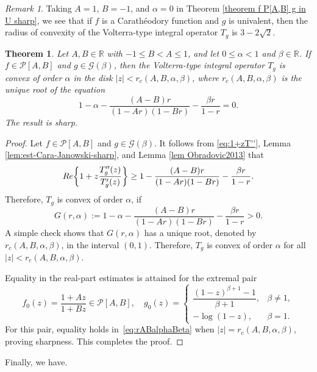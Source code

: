 \documentclass[12pt,a4paper]{amsart}
\numberwithin{equation}{section}
\newtheorem{theorem}{Theorem}[section]
\theoremstyle{remark}
\newtheorem{remark}{Remark}[section]
\begin{document}
\begin{remark}
  Taking $A=1$, $B=-1$, and $\alpha=0$ in Theorem \ref{theorem f P[A,B] g in U sharp}, we see that if $f$ is a Carath\'eodory function and $g$ is univalent, then the radius of convexity of the Volterra-type integral operator $T_g$ is $3-2\sqrt{2}$. 
\end{remark}

\begin{theorem}\label{theorem f starlike g in G beta sharp improved}
Let $A,B\in\mathbb{R}$ with $-1\le B<A\le 1$, and let $0\le \alpha<1$ and $\beta\in \mathbb R$.  
If $f\in\mathcal{P}[A,B]$ and $g\in\mathcal{G}(\beta)$, then the Volterra-type integral operator $T_g$ is convex of order $\alpha$ in the disk $|z|<r_c(A,B,\alpha,\beta)$,  
where \(r_c(A,B,\alpha,\beta)\) is the unique root of the equation
\begin{equation}\label{eq:rABalphaBeta}
1-\alpha-\frac{(A-B)r}{(1-A r)(1-B r)}-\frac{\beta r}{1-r}=0.
\end{equation}
The result is sharp.
\end{theorem}

\begin{proof}
  Let $f\in\mathcal{P}[A,B]$ and $g \in \mathcal{G}(\beta)$. It follows from \eqref{eq:1+zT''}, Lemma \ref{lem:est-Cara-Janowski-sharp}, and Lemma \ref{lem Obradovic2013} that
\[
{\rm Re}\!\left\{1+z\frac{T_g''(z)}{T_g'(z)}\right\}
\ge 1-\frac{(A-B)r}{(1-A r)(1-B r)}-\frac{\beta r}{1-r}.
\]
Therefore, \(T_g\) is convex of order \(\alpha\), if
\[
G(r,\alpha):=1-\alpha-\frac{(A-B)r}{(1-A r)(1-B r)}-\frac{\beta r}{1-r}>0.
\]
A simple check shows that $G(r,\alpha)$ has a unique root, denoted by \(r_c(A,B,\alpha,\beta)\), in the interval  $(0,1)$.  
Therefore, \(T_g\) is convex of order \(\alpha\) for all \(|z|<r_c(A,B,\alpha,\beta)\).

  
Equality in the real-part estimates is attained for the extremal pair
\[
f_0(z)=\frac{1+Az}{1+Bz}\in\mathcal{P}[A,B], \quad 
g_0(z)=
\begin{cases}
\dfrac{(1-z)^{\beta+1}-1}{\beta+1}, & \beta\neq1,\\[6pt]
-\log(1-z), & \beta=1.
\end{cases}
\]
For this pair, equality holds in~\eqref{eq:rABalphaBeta} when \(|z|=r_c(A,B,\alpha,\beta)\), proving sharpness.
This completes the proof.
\end{proof}

Finally, we have.
\end{document}
